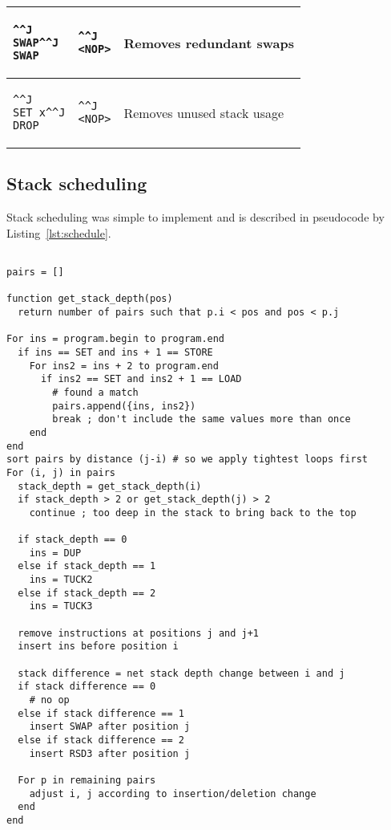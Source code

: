 \begin{table}
\begin{tabularx}{\linewidth}{l l X}
\begin{lstlisting}^^J
SWAP^^J
SWAP
\end{lstlisting} &
\begin{lstlisting}^^J
<NOP>
\end{lstlisting} &
Removes redundant swaps \\ \midrule
\begin{lstlisting}^^J
SET x^^J
DROP
\end{lstlisting} &
\begin{lstlisting}^^J
<NOP>
\end{lstlisting} &
Removes unused stack usage \\ \bottomrule
\end{tabularx}
\end{table}

\subsection{Stack scheduling}
Stack scheduling was simple to implement and is described in pseudocode by
Listing~\ref{lst:schedule}.

\begin{lstlisting}[caption={Stack scheduling
implementation},float,label=lst:schedule]

pairs = []

function get_stack_depth(pos)
  return number of pairs such that p.i < pos and pos < p.j

For ins = program.begin to program.end
  if ins == SET and ins + 1 == STORE
    For ins2 = ins + 2 to program.end
      if ins2 == SET and ins2 + 1 == LOAD
        # found a match
        pairs.append({ins, ins2})
        break ; don't include the same values more than once
    end
end
sort pairs by distance (j-i) # so we apply tightest loops first
For (i, j) in pairs
  stack_depth = get_stack_depth(i)
  if stack_depth > 2 or get_stack_depth(j) > 2
    continue ; too deep in the stack to bring back to the top

  if stack_depth == 0
    ins = DUP
  else if stack_depth == 1
    ins = TUCK2
  else if stack_depth == 2
    ins = TUCK3

  remove instructions at positions j and j+1
  insert ins before position i

  stack difference = net stack depth change between i and j
  if stack difference == 0
    # no op
  else if stack difference == 1
    insert SWAP after position j
  else if stack difference == 2
    insert RSD3 after position j

  For p in remaining pairs
    adjust i, j according to insertion/deletion change
  end
end
\end{lstlisting}

